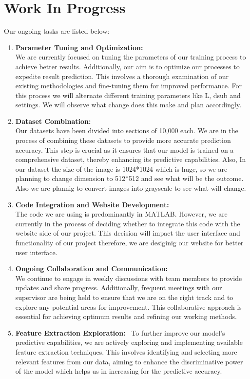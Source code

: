 \chapter{Work In Progress}
Our ongoing tasks are listed below:
\begin{enumerate}[label=\arabic*.]
    \item \textbf{Parameter Tuning and Optimization:} \\
    We are currently focused on tuning the parameters of our training process to achieve better results. Additionally, our aim is to optimize our processes to expedite result prediction. This involves a thorough examination of our existing methodologies and fine-tuning them for improved performance. For this process we will alternate different training parameters like L, dsub and settings. We will observe what change does this make and plan accordingly.
    
    \item \textbf{Dataset Combination:} \\
    Our datasets have been divided into sections of 10,000 each. We are in the process of combining these datasets to provide more accurate prediction accuracy. This step is crucial as it ensures that our model is trained on a comprehensive dataset, thereby enhancing its predictive capabilities. Also, In our dataset the size of the image is 1024*1024 which is huge, so we are planning to change dimension to 512*512 and see what will be the outcome. Also we are plannig to convert images into grayscale to see what will change.
    
    \item \textbf{Code Integration and Website Development:} \\
    The code we are using is predominantly in MATLAB. However, we are currently in the process of deciding whether to integrate this code with the website side of our project. This decision will impact the user interface and functionality of our project therefore, we are desiginig our website for better user interface.
    
    \item \textbf{Ongoing Collaboration and Communication:} \\
    We continue to engage in weekly discussions with team members to provide updates and share progress. Additionally, frequent meetings with our supervisor are being held to ensure that we are on the right track and to explore any potential areas for improvement. This collaborative approach is essential for achieving optimum results and refining our working methods.

    
    \item \textbf{Feature Extraction Exploration:} \
    To further improve our model's predictive capabilities, we are actively exploring and implementing available  feature extraction techniques. This involves identifying and selecting more relevant features from our data, aiming to enhance the discriminative power of the model which helps us in increasing for the predictive accuracy.


\end{enumerate}